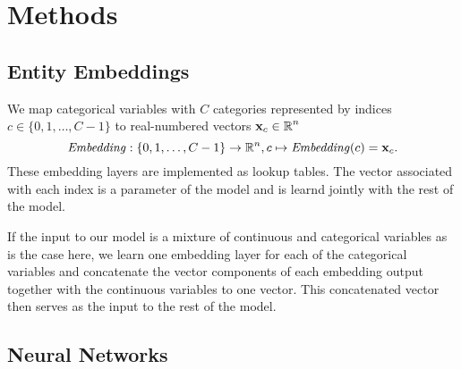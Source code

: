 \section{Methods}%
\label{sec:methods}

\subsection{Entity Embeddings}%
\label{sub:entity_embeddings}

We map categorical variables with $C$ categories represented by indices $c \in
\{ 0,1,\dots,C-1\}$ to real-numbered vectors $\mathbf{x}_c \in \operatorname{\mathbb{R}}^n$
\begin{equation}
    \operatorname{\text{\textit{Embedding}}}: \{0,1,\dots,C-1\} \rightarrow \operatorname{\mathbb{R}}^n, c \mapsto \operatorname{\text{\textit{Embedding}}}(c) = \mathbf{x}_c.
\end{equation}
These embedding layers are implemented as lookup tables. The vector associated
with each index is a parameter of the model and is learnd jointly with the rest
of the model.

If the input to our model is a mixture of continuous and categorical variables
as is the case here, we learn one embedding layer for each of the categorical
variables and concatenate the vector components of each embedding output
together with the continuous variables to one vector. This concatenated vector
then serves as the input to the rest of the model.

\subsection{Neural Networks}%
\label{sub:neural_networks}

